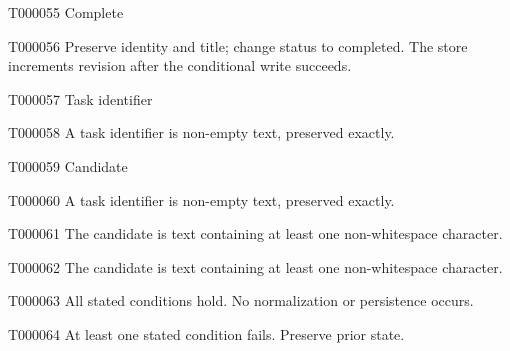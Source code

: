 \documentclass[11pt,a4paper]{article}
\begin{document}
\begin{atlastext}{T000055}
Complete
\end{atlastext}
\begin{atlasparagraph}{T000056}
Preserve identity and title; change status to completed. The store increments revision after the conditional write succeeds.
\end{atlasparagraph}
\begin{atlastext}{T000057}
Task identifier
\end{atlastext}
\begin{atlasparagraph}{T000058}
A task identifier is non-empty text, preserved exactly.
\end{atlasparagraph}
\begin{atlastext}{T000059}
Candidate
\end{atlastext}
\begin{atlasparagraph}{T000060}
A task identifier is non-empty text, preserved exactly.
\end{atlasparagraph}
\begin{atlastext}{T000061}
The candidate is text containing at least one non-whitespace character.
\end{atlastext}
\begin{atlasparagraph}{T000062}
The candidate is text containing at least one non-whitespace character.
\end{atlasparagraph}
\begin{atlasparagraph}{T000063}
All stated conditions hold. No normalization or persistence occurs.
\end{atlasparagraph}
\begin{atlasparagraph}{T000064}
At least one stated condition fails. Preserve prior state.
\end{atlasparagraph}
\end{document}
